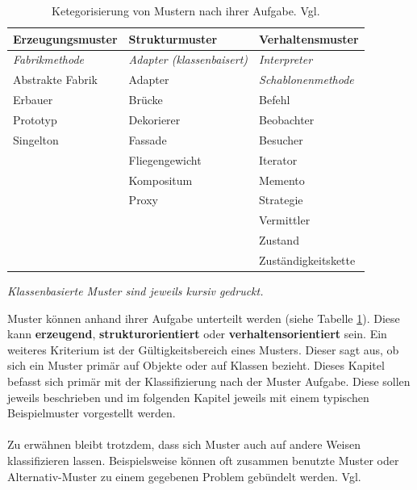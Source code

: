 \documentclass[fontsize=11pt,a4paper,final]{scrreprt}[2003/01/01]
\begin{document}
\begin{table}[H]
	\caption{Ketegorisierung von Mustern nach ihrer Aufgabe. Vgl. \cite[S. 14]{gamma2004}}\label{ta:Klassifizierung}
	\begin{center}
		\begin{tabular}{|l|l|l|}
			\hline
			\bf Erzeugungsmuster   & \bf Strukturmuster                & \bf Verhaltensmuster       \\
			\hline
			\textit{Fabrikmethode} & \textit{Adapter (klassenbaisert)} & \textit{Interpreter}       \\
			Abstrakte Fabrik       & Adapter                           & \textit{Schablonenmethode} \\
			Erbauer                & Brücke                           & Befehl                     \\
			Prototyp               & Dekorierer                        & Beobachter                 \\
			Singelton              & Fassade                           & Besucher                   \\
			                       & Fliegengewicht                    & Iterator                   \\
			                       & Kompositum                        & Memento                    \\
			                       & Proxy                             & Strategie                  \\
			                       &                                   & Vermittler                 \\
			                       &                                   & Zustand                    \\
			                       &                                   & Zuständigkeitskette       \\
			\hline
		\end{tabular}
	\end{center}
	\begin{center}
		\small{\textit{Klassenbasierte Muster sind jeweils kursiv gedruckt.}}
	\end{center}
\end{table}

Muster können anhand ihrer Aufgabe unterteilt werden (siehe Tabelle \ref{ta:Klassifizierung}). Diese kann \textbf{ erzeugend},\textbf{ strukturorientiert} oder \textbf{verhaltensorientiert} sein. Ein weiteres Kriterium ist der Gültigkeitsbereich eines Musters. Dieser sagt aus, ob sich ein Muster primär auf Objekte oder auf Klassen bezieht.
Dieses Kapitel befasst sich primär mit der Klassifizierung nach der Muster Aufgabe. Diese sollen jeweils beschrieben und im folgenden Kapitel jeweils mit einem typischen Beispielmuster vorgestellt werden. 
\\ \\
Zu erwähnen bleibt trotzdem, dass sich Muster auch auf andere Weisen klassifizieren lassen. Beispielsweise können oft zusammen benutzte Muster oder Alternativ-Muster zu einem gegebenen Problem gebündelt werden. Vgl. \cite[S. 14]{gamma2004}
\end{document}
